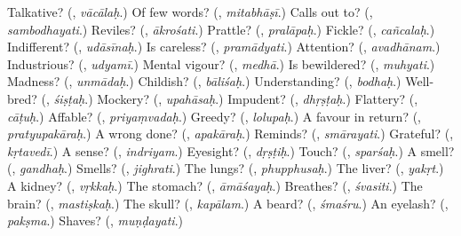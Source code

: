 \begin{tcolorbox}[breakable,colback=teal!4,colframe=teal!35!black,title={Before you move on}]
Talkative? (\textbf{}, \emph{vācālaḥ}.) Of few words? (\textbf{}, \emph{mitabhāṣī}.) Calls out to? (\textbf{}, \emph{sambodhayati}.) Reviles? (\textbf{}, \emph{ākrośati}.) Prattle? (\textbf{}, \emph{pralāpaḥ}.) Fickle? (\textbf{}, \emph{cañcalaḥ}.) Indifferent? (\textbf{}, \emph{udāsīnaḥ}.) Is careless? (\textbf{}, \emph{pramādyati}.) Attention? (\textbf{}, \emph{avadhānam}.) Industrious? (\textbf{}, \emph{udyamī}.) Mental vigour? (\textbf{}, \emph{medhā}.) Is bewildered? (\textbf{}, \emph{muhyati}.) Madness? (\textbf{}, \emph{unmādaḥ}.) Childish? (\textbf{}, \emph{bāliśaḥ}.) Understanding? (\textbf{}, \emph{bodhaḥ}.) Well-bred? (\textbf{}, \emph{śiṣṭaḥ}.) Mockery? (\textbf{}, \emph{upahāsaḥ}.) Impudent? (\textbf{}, \emph{dhṛṣṭaḥ}.) Flattery? (\textbf{}, \emph{cāṭuḥ}.) Affable? (\textbf{}, \emph{priyaṃvadaḥ}.) Greedy? (\textbf{}, \emph{lolupaḥ}.) A favour in return? (\textbf{}, \emph{pratyupakāraḥ}.) A wrong done? (\textbf{}, \emph{apakāraḥ}.) Reminds? (\textbf{}, \emph{smārayati}.) Grateful? (\textbf{}, \emph{kṛtavedī}.) A sense? (\textbf{}, \emph{indriyam}.) Eyesight? (\textbf{}, \emph{dṛṣṭiḥ}.) Touch? (\textbf{}, \emph{sparśaḥ}.) A smell? (\textbf{}, \emph{gandhaḥ}.) Smells? (\textbf{}, \emph{jighrati}.) The lungs? (\textbf{}, \emph{phupphusaḥ}.) The liver? (\textbf{}, \emph{yakṛt}.) A kidney? (\textbf{}, \emph{vṛkkaḥ}.) The stomach? (\textbf{}, \emph{āmāśayaḥ}.) Breathes? (\textbf{}, \emph{śvasiti}.) The brain? (\textbf{}, \emph{mastiṣkaḥ}.) The skull? (\textbf{}, \emph{kapālam}.) A beard? (\textbf{}, \emph{śmaśru}.) An eyelash? (\textbf{}, \emph{pakṣma}.) Shaves? (\textbf{}, \emph{muṇḍayati}.)
\end{tcolorbox}

